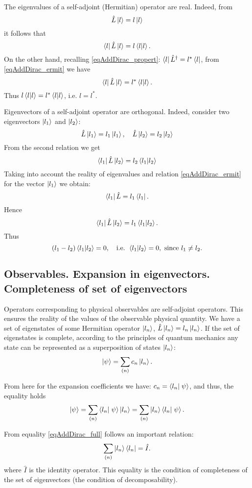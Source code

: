The eigenvalues of a self-adjoint (Hermitian) operator are real. Indeed, from 
\[
\hat{L} \ket{ l } = l \ket{ l }
\]
it follows that 
\[
\bra{ l } \hat{L} \ket{ l } = l \bra{ l }
\ket{ l }.
\]
On the other hand, recalling \eqref{eqAddDirac_propert}:
$\bra{ l } \hat{L}^{\dag} = l^{*} \bra{ l }$, from
\eqref{eqAddDirac_ermit} we have
\[
\bra{ l } \hat{L} \ket{ l } = l^{*} \bra{ l }
\ket{ l }.
\] 
Thus $l\bra{ l }
\ket{ l } = l^{*}\bra{ l }
\ket{ l }$, i.e. $l  = l^{*}$.

Eigenvectors of a self-adjoint operator are orthogonal. 
Indeed, consider two eigenvectors 
$\ket{ l_1 }$ and $\ket{ l_2 }$:
\[
\hat{L} \ket{ l_1 } = l_1 \ket{ l_1 }, \quad
\hat{L} \ket{ l_2 } = l_2 \ket{ l_2 }
\]
From the second relation we get
\[
\bra{ l_1 } \hat{L} \ket{ l_2 } = l_2 \bra{ l_1 } \ket{ l_2 }
\]
Taking into account the reality of eigenvalues and relation
\eqref{eqAddDirac_ermit} for the vector $\ket{ l_1 }$ we obtain:
\[
\bra{ l_1 } \hat{L} = l_1 \bra{ l_1 }.
\]
Hence
\[
\bra{ l_1 } \hat{L} \ket{ l_2 } = l_1 \bra{ l_1 } \ket{ l_2 }.
\] 
Thus
\[
\left(l_1 - l_2\right) \bra{ l_1 } \ket{ l_2 } = 0, 
\quad \mbox{i.e. } \bra{ l_1 } \ket{ l_2 } = 0,
\mbox{ since } l_1 \neq l_2.
\] 

\subsection{Observables. Expansion in eigenvectors. Completeness of set of eigenvectors}
Operators corresponding to physical observables are self-adjoint operators. This ensures the reality of the values of the observable physical quantity. We have a set of eigenstates of some Hermitian operator  
$\ket{ l_n }$,  $\hat{L} \ket{ l_n } = l_n \ket{ l_n }$.  If the set of eigenstates is complete, according to the principles of quantum mechanics any state can be represented as a superposition
of states $\ket{ l_n }$:
\begin{equation}  
\left| \psi \right> = \sum_{(n)} c_n \ket{ l_n }.
\end{equation}  

From here for the expansion coefficients we have:  
$c_n = \bra{ l_n } \left. \psi \right>$, and thus,
the equality holds 
\begin{equation}  
\left| \psi \right> = \sum_{(n)} \bra{ l_n } \left. \psi
\right> \ket{ l_n } = 
\sum_{(n)} \ket{ l_n } \bra{ l_n } \left. \psi
\right>.
\label{eqAddDirac_full}
\end{equation}  

From equality \ref{eqAddDirac_full} follows an important relation:
\begin{equation}  
\sum_{(n)} \ket{ l_n } \bra{ l_n } = \hat{I}.
\label{eqAddDiracI}
\end{equation}  
where $\hat{I}$ is the identity operator. This equality is the condition of completeness of the set of eigenvectors (the condition of decomposability).


